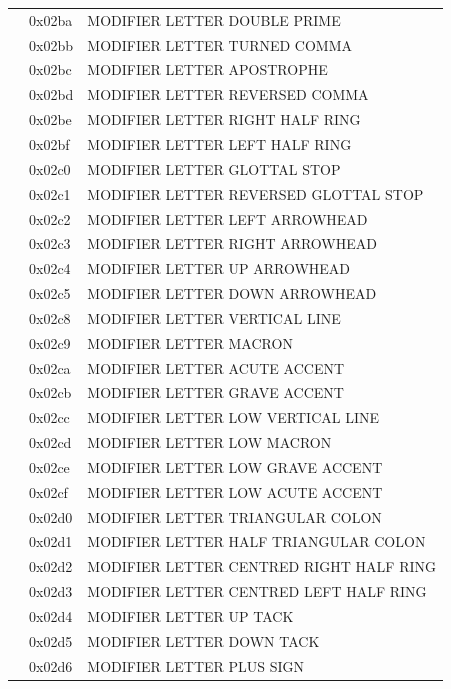 \documentclass[12pt, twoside]{article}
\begin{document}
\begin{longtable}{L{1.0cm} L{2.0cm} >{\footnotesize}L{10cm}}
&0x02ba&MODIFIER LETTER DOUBLE PRIME\\
&0x02bb&MODIFIER LETTER TURNED COMMA\\
&0x02bc&MODIFIER LETTER APOSTROPHE\\
&0x02bd&MODIFIER LETTER REVERSED COMMA\\
&0x02be&MODIFIER LETTER RIGHT HALF RING\\
&0x02bf&MODIFIER LETTER LEFT HALF RING\\
&0x02c0&MODIFIER LETTER GLOTTAL STOP\\
&0x02c1&MODIFIER LETTER REVERSED GLOTTAL STOP\\
&0x02c2&MODIFIER LETTER LEFT ARROWHEAD\\
&0x02c3&MODIFIER LETTER RIGHT ARROWHEAD\\
&0x02c4&MODIFIER LETTER UP ARROWHEAD\\
&0x02c5&MODIFIER LETTER DOWN ARROWHEAD\\
&0x02c8&MODIFIER LETTER VERTICAL LINE\\
&0x02c9&MODIFIER LETTER MACRON\\
&0x02ca&MODIFIER LETTER ACUTE ACCENT\\
&0x02cb&MODIFIER LETTER GRAVE ACCENT\\
&0x02cc&MODIFIER LETTER LOW VERTICAL LINE\\
&0x02cd&MODIFIER LETTER LOW MACRON\\
&0x02ce&MODIFIER LETTER LOW GRAVE ACCENT\\
&0x02cf&MODIFIER LETTER LOW ACUTE ACCENT\\
&0x02d0&MODIFIER LETTER TRIANGULAR COLON\\
&0x02d1&MODIFIER LETTER HALF TRIANGULAR COLON\\
&0x02d2&MODIFIER LETTER CENTRED RIGHT HALF RING\\
&0x02d3&MODIFIER LETTER CENTRED LEFT HALF RING\\
&0x02d4&MODIFIER LETTER UP TACK\\
&0x02d5&MODIFIER LETTER DOWN TACK\\
&0x02d6&MODIFIER LETTER PLUS SIGN\\

\end{longtable}
\end{document}
